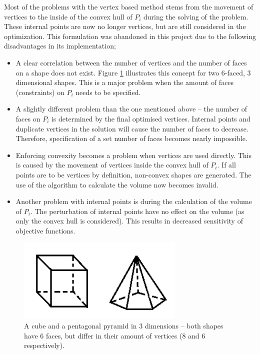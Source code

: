 Most of the problems with the vertex based method stems from the movement of vertices to the inside of the convex hull of $P_i$ during the solving of the problem.
These internal points are now no longer vertices, but are still considered in the optimization.
This formulation was abandoned in this project due to the following disadvantages in its implementation;
\begin{itemize}
  \item A clear correlation between the number of vertices and the number of faces on a shape does not exist.
Figure \ref{fig:vertsvsfaces} illustrates this concept for two 6-faced, 3 dimensional shapes.
This is a major problem when the amount of faces (constraints) on $P_i$ needs to be specified.
  \item A slightly different problem than the one mentioned above -- the number of faces on $P_i$ is determined by the final optimised vertices.
Internal points and duplicate vertices in the solution will cause the number of faces to decrease.
Therefore, specification of a set number of faces becomes nearly impossible.
  \item Enforcing convexity becomes a problem when vertices are used directly.
This is caused by the movement of vertices inside the convex hull of $P_i$.
If all points are to be vertices by definition, non-convex shapes are generated.
The use of the \qhull algorithm to calculate the volume now becomes invalid. 
  \item Another problem with internal points is during the calculation of the volume of $P_i$.
The perturbation of internal points have no effect on the volume (as only the convex hull is considered).
This results in decreased sensitivity of objective functions.
\end{itemize}

\begin{figure}[htbp]
  \centering
  \includegraphics[width=8cm]{graph/vertsvsfaces}
  \caption[The unclear correlation between number of faces and vertices]{A cube and a pentagonal pyramid in 3 dimensions -- both shapes have 6 faces, but differ in their amount of vertices (8 and 6  respectively).}
  \label{fig:vertsvsfaces}
\end{figure}

